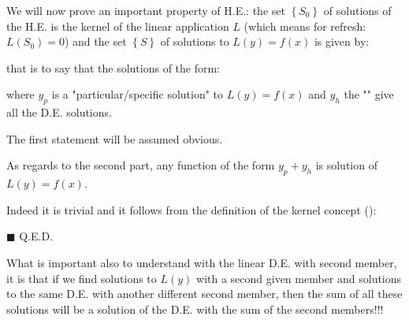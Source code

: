	\begin{theorem}
	We will now prove an important property of H.E.: the set $\left\lbrace S_0 \right\rbrace$ of solutions of the H.E. is the kernel of the linear application $L$ (which means for refresh: $L(S_0)=0$) and the set  $\left\lbrace S \right\rbrace$ of solutions to $L(y)=f(x)$ is given by:
	
	that is to say that the solutions of the form:
	
	where $y_p$ is a "particular/specific solution" to $L(y)=f(x)$ and $y_h$ the "" give all the D.E. solutions.
	\end{theorem}
	\begin{dem}
	The first statement will be assumed obvious.
	
	As regards to the second part, any function of the form $y_p+y_h$ is solution of $L(y)=f(x)$.
	
	Indeed it is trivial and it follows from the definition of the kernel concept ():
	
	\begin{flushright}
		$\blacksquare$  Q.E.D.
	\end{flushright}
	\end{dem}
	What is important also to understand with the linear D.E. with second member, it is that if we find solutions to $L(y)$ with a second given member and solutions to the same D.E. with another different second member, then the sum of all these solutions will be a solution of the D.E. with the sum of the second members!!!\label{sum solutions of differential equations}
	
